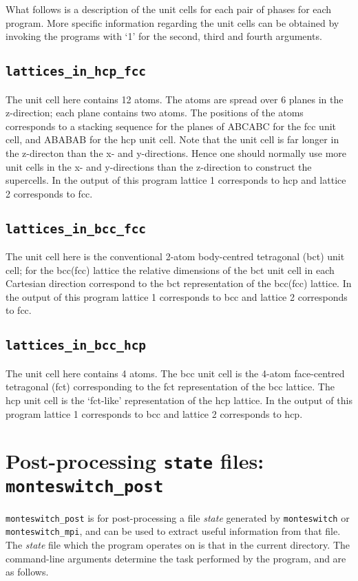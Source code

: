\documentclass{report}
\begin{document}
What follows is a description of the unit cells for each pair of phases for each program. More specific information regarding the unit
cells can be obtained by invoking the programs with `1' for the second, third and fourth arguments. 

\subsection{\texttt{lattices\_in\_hcp\_fcc}}
The unit cell here contains 12 atoms. The atoms are spread over 6 planes in the z-direction; each plane contains two atoms. The positions
of the atoms corresponds to a stacking sequence for the planes of ABCABC for the fcc unit cell, and  ABABAB for the hcp unit cell. 
Note that the unit cell is far longer in the z-directon than the x- and y-directions. Hence one should normally use more unit cells in 
the x- and y-directions than the z-direction to construct the supercells. In the output of this program lattice 1 corresponds to hcp and
lattice 2 corresponds to fcc.

\subsection{\texttt{lattices\_in\_bcc\_fcc}}
The unit cell here is the conventional 2-atom body-centred tetragonal (bct) unit cell; for the bcc(fcc) lattice the relative dimensions of 
the bct unit cell in each Cartesian direction correspond to the bct representation of the bcc(fcc) lattice. In the output of this program
lattice 1 corresponds to bcc and lattice 2 corresponds to fcc.

\subsection{\texttt{lattices\_in\_bcc\_hcp}}
The unit cell here contains 4 atoms. The bcc unit cell is the 4-atom face-centred tetragonal (fct) corresponding to the fct representation of 
the bcc lattice. The hcp unit cell is the `fct-like' representation of the hcp lattice. In the output of this program
lattice 1 corresponds to bcc and lattice 2 corresponds to hcp.


\section{Post-processing \texttt{state} files: \texttt{monteswitch\_post}}\label{sec:monteswitch_post}
\texttt{monteswitch\_post} is for post-processing a file \emph{state} generated by \texttt{monteswitch} or \texttt{monteswitch\_mpi}, and can
be used to extract useful information from that file. The \emph{state} file which the program operates on is that in the current directory.
The command-line arguments determine the task performed by the program, and are as follows.
\end{document}
